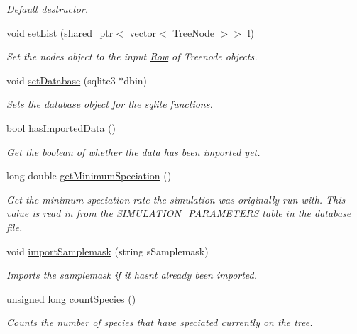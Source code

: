 \begin{DoxyCompactItemize}
\begin{DoxyCompactList}\small\item\em Default destructor. \end{DoxyCompactList}\item 
void \hyperlink{class_community_aa98af8a7347472a2eb846342f72b8163}{set\+List} (shared\+\_\+ptr$<$ vector$<$ \hyperlink{class_tree_node}{Tree\+Node} $>$$>$ l)
\begin{DoxyCompactList}\small\item\em Set the nodes object to the input \hyperlink{class_row}{Row} of Treenode objects. \end{DoxyCompactList}\item 
void \hyperlink{class_community_a6fe2fdb93911f403dd879ca2847e4933}{set\+Database} (sqlite3 $\ast$dbin)
\begin{DoxyCompactList}\small\item\em Sets the database object for the sqlite functions. \end{DoxyCompactList}\item 
bool \hyperlink{class_community_a045f762ca30c3a20e8ef5911a4982160}{has\+Imported\+Data} ()
\begin{DoxyCompactList}\small\item\em Get the boolean of whether the data has been imported yet. \end{DoxyCompactList}\item 
long double \hyperlink{class_community_a4e5dea65183810c3b27441736eca825a}{get\+Minimum\+Speciation} ()
\begin{DoxyCompactList}\small\item\em Get the minimum speciation rate the simulation was originally run with. This value is read in from the S\+I\+M\+U\+L\+A\+T\+I\+O\+N\+\_\+\+P\+A\+R\+A\+M\+E\+T\+E\+RS table in the database file. \end{DoxyCompactList}\item 
void \hyperlink{class_community_a01a137383e1e23f2191d63f16513a00a}{import\+Samplemask} (string s\+Samplemask)
\begin{DoxyCompactList}\small\item\em Imports the samplemask if it hasn\textquotesingle{}t already been imported. \end{DoxyCompactList}\item 
unsigned long \hyperlink{class_community_a07970398c04e7c31ceda695c2860e20f}{count\+Species} ()
\begin{DoxyCompactList}\small\item\em Counts the number of species that have speciated currently on the tree. \end{DoxyCompactList}\item 
$$
\end{DoxyCompactItemize}
